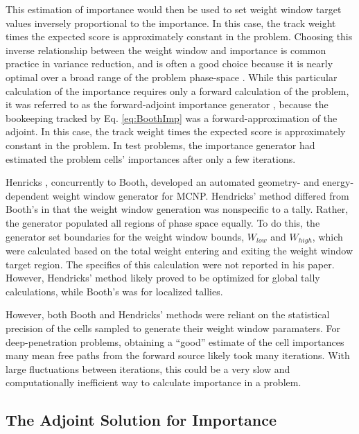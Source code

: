This estimation of importance would then be used to set
weight window target values inversely proportional to the importance.
In this case, the track weight times the expected score is approximately
constant in the problem. Choosing this inverse relationship between the weight
window and importance is common practice in variance reduction, and is often a
good choice because it is nearly optimal over a broad range of the problem
phase-space \cite{booth_common_2012}.
While this
particular calculation of the importance requires only a forward calculation of
the problem, it was referred to as the forward-adjoint importance generator
\cite{booth_automatic_1982, booth_deep_1982, booth_importance_1984}, because the
bookeeping tracked by Eq. \eqref{eq:BoothImp} was a forward-approximation of the
adjoint.
In this case, the track weight times the expected score is approximately
constant in the problem.
In test problems, the importance generator had estimated the problem cells'
importances after only a few iterations.

Henricks \cite{hendricks_code-generated_1982}, concurrently to Booth, developed
an automated geometry- and energy-dependent weight window generator for MCNP.
Hendricks' method differed from Booth's in that the weight window generation was
nonspecific to a tally.
Rather, the generator populated all regions of phase space equally.
To do this, the generator set boundaries for the weight window bounds, $W_{low}$
and $W_{high}$, which were calculated based on the total weight entering and
exiting the weight window target region. The specifics of this calculation were
not reported in his paper. However, Hendricks' method likely proved to be
optimized for global tally calculations, while Booth's was for localized
tallies.

However, both Booth and Hendricks' methods were reliant on the statistical
precision of the cells sampled to generate their weight window paramaters. For
deep-penetration problems, obtaining a ``good'' estimate of the cell importances
many mean free paths from the forward source likely took many iterations. With
large fluctuations between iterations, this could be a very slow and
computationally inefficient way to calculate importance in a problem.

\subsection{The Adjoint Solution for Importance}
\label{sec:AdjointImportance}

